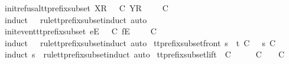 \begin{isabellebody}
%
\endisadelimproof
\isanewline
{}\isamarkupfalse%
\ init{\isacharunderscore}refusal{\isacharunderscore}tt{\isacharunderscore}prefix{\isacharunderscore}subset{\isacharcolon}\ {\isachardoublequoteopen}{\isacharbrackleft}X{\isacharbrackright}\isactrlsub R\ {\isacharhash}\ {\isasymrho}\ {\isasymlesssim}\isactrlsub C\ {\isacharbrackleft}Y{\isacharbrackright}\isactrlsub R\ {\isacharhash}\ {\isasymsigma}\ {\isasymLongrightarrow}\ {\isasymrho}\ {\isasymlesssim}\isactrlsub C\ {\isasymsigma}{\isachardoublequoteclose}\isanewline
%
\isadelimproof
\ \ %
\endisadelimproof
%
\isatagproof
{}\isamarkupfalse%
\ {\isacharparenleft}induct\ {\isasymrho}\ {\isasymsigma}\ rule{\isacharcolon}tt{\isacharunderscore}prefix{\isacharunderscore}subset{\isachardot}induct{\isacharcomma}\ auto{\isacharparenright}%
\endisatagproof
{\isafoldproof}%
%
\isadelimproof
\isanewline
%
\endisadelimproof
\isanewline
{}\isamarkupfalse%
\ init{\isacharunderscore}event{\isacharunderscore}tt{\isacharunderscore}prefix{\isacharunderscore}subset{\isacharcolon}\ {\isachardoublequoteopen}{\isacharbrackleft}e{\isacharbrackright}\isactrlsub E\ {\isacharhash}\ {\isasymrho}\ {\isasymlesssim}\isactrlsub C\ {\isacharbrackleft}f{\isacharbrackright}\isactrlsub E\ {\isacharhash}\ {\isasymsigma}\ {\isasymLongrightarrow}\ {\isasymrho}\ {\isasymlesssim}\isactrlsub C\ {\isasymsigma}{\isachardoublequoteclose}\isanewline
%
\isadelimproof
\ \ %
\endisadelimproof
%
\isatagproof
{}\isamarkupfalse%
\ {\isacharparenleft}induct\ {\isasymrho}\ {\isasymsigma}\ rule{\isacharcolon}tt{\isacharunderscore}prefix{\isacharunderscore}subset{\isachardot}induct{\isacharcomma}\ auto{\isacharparenright}%
\endisatagproof
{\isafoldproof}%
%
\isadelimproof
\isanewline
%
\endisadelimproof
\isanewline
{}\isamarkupfalse%
\ tt{\isacharunderscore}prefix{\isacharunderscore}subset{\isacharunderscore}front{\isacharcolon}\ {\isachardoublequoteopen}s\ {\isacharat}\ t\ {\isasymlesssim}\isactrlsub C\ {\isasymsigma}\ {\isasymLongrightarrow}\ s\ {\isasymlesssim}\isactrlsub C\ {\isasymsigma}{\isachardoublequoteclose}\isanewline
%
\isadelimproof
\ \ %
\endisadelimproof
%
\isatagproof
{}\isamarkupfalse%
\ {\isacharparenleft}induct\ s\ {\isasymsigma}\ rule{\isacharcolon}tt{\isacharunderscore}prefix{\isacharunderscore}subset{\isachardot}induct{\isacharcomma}\ auto{\isacharparenright}%
\endisatagproof
{\isafoldproof}%
%
\isadelimproof
\isanewline
%
\endisadelimproof
\isanewline
{}\isamarkupfalse%
\ tt{\isacharunderscore}prefix{\isacharunderscore}subset{\isacharunderscore}lift{\isacharcolon}\ {\isachardoublequoteopen}{\isasymrho}\ {\isasymlesssim}\isactrlsub C\ {\isasymsigma}\ {\isasymLongrightarrow}\ {\isasymexists}\ {\isasymrho}{\isacharprime}{\isachardot}\ {\isasymrho}{\isacharprime}\ {\isasymle}\isactrlsub C\ {\isasymsigma}\ {\isasymand}\ {\isasymrho}\ {\isasymlesssim}\isactrlsub C\ {\isasymrho}{\isacharprime}{\isachardoublequoteclose}\isanewline

\end{isabellebody}
